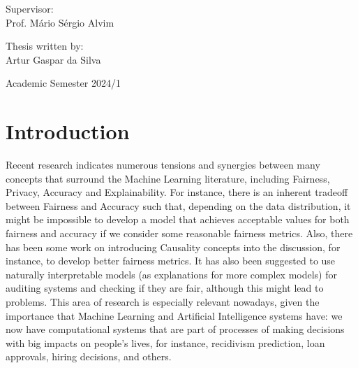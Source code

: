 \documentclass[conference]{IEEEtran}
\begin{document}
\begin{titlepage}
\begin{center}
        \vspace{0.5cm}


     \end{center}

\raggedright

\Large
    Supervisor:
    \vspace{0.2cm}\\
\Large
    Prof. Mário Sérgio Alvim
    \vspace{0.125cm}\\

\raggedleft

\Large
    Thesis written by:
    \vspace{0.125cm}\\
\Large
    Artur Gaspar da Silva



\begin{center}
    \vspace{1cm}
        Academic Semester 2024/1
\end{center}

\end{titlepage}


\newpage
\tableofcontents
\newpage
\section{Introduction}

Recent research\cite{Sok}\cite{Reductions}\cite{Rachel}\cite{Awareness} indicates numerous tensions and synergies between many concepts that surround the Machine Learning literature, including Fairness, Privacy, Accuracy and Explainability. For instance, there is an inherent tradeoff between Fairness and Accuracy such that, depending on the data distribution, it might be impossible to develop a model that achieves acceptable values for both fairness and accuracy if we consider some reasonable fairness metrics\cite{Carlos}. Also, there has been some work on introducing Causality concepts into the discussion, for instance, to develop better fairness metrics\cite{CausalFair}. It has also been suggested to use naturally interpretable models (as explanations for more complex models) for auditing systems and checking if they are fair, although this might lead to problems\cite{ExplainAll}. This area of research is especially relevant nowadays, given the importance that Machine Learning and Artificial Intelligence systems have: we now have computational systems that are part of processes of making decisions with big impacts on people's lives, for instance, recidivism prediction\cite{Compass}, loan approvals\cite{Loans}, hiring decisions\cite{Jobs}, and others.
\end{document}
